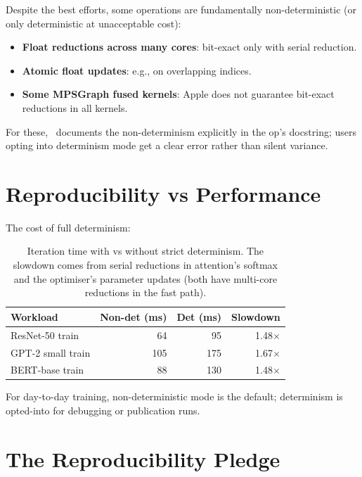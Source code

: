 Despite the best efforts, some operations are fundamentally
non-deterministic (or only deterministic at unacceptable cost):

\begin{itemize}
  \item \textbf{Float reductions across many cores}:
    bit-exact only with serial reduction.
  \item \textbf{Atomic float updates}: e.g., 
    on overlapping indices.
  \item \textbf{Some MPSGraph fused kernels}: Apple does not
    guarantee bit-exact reductions in all kernels.
\end{itemize}

For these, \Lucid\ documents the non-determinism explicitly in
the op's docstring; users opting into determinism mode get a
clear error rather than silent variance.

\section{Reproducibility vs Performance}
\label{sec:reproducibility:tradeoff}

The cost of full determinism:

\begin{table}[t]
\centering
\small
\begin{tabular}{lrrr}
\toprule
Workload & Non-det (ms) & Det (ms) & Slowdown \\
\midrule
ResNet-50 train       & 64  & 95  & 1.48$\times$ \\
GPT-2 small train     & 105 & 175 & 1.67$\times$ \\
BERT-base train       & 88  & 130 & 1.48$\times$ \\
\bottomrule
\end{tabular}
\caption[Determinism cost.]{Iteration time with vs without
strict determinism. The slowdown comes from serial reductions
in attention's softmax and the optimiser's parameter updates
(both have multi-core reductions in the fast path).}
\label{tab:reproducibility:cost}
\end{table}

For day-to-day training, non-deterministic mode is the default;
determinism is opted-into for debugging or publication runs.

\section{The Reproducibility Pledge}
\label{sec:reproducibility:pledge}

